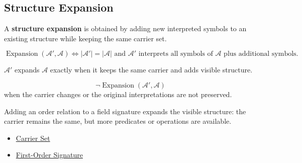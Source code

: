 \subsection*{Structure Expansion}
\label{subsec:structure-expansion}

\begin{definition}
\label{def:structure-expansion}
A \textbf{structure expansion} is obtained by adding new interpreted symbols to
an existing structure while keeping the same carrier set.
\end{definition}

\begin{remark*}
\[
\operatorname{Expansion}(\mathcal{A}',\mathcal{A})
\Longleftrightarrow
|\mathcal{A}'|=|\mathcal{A}|
\text{ and } \mathcal{A}' \text{ interprets all symbols of } \mathcal{A}
\text{ plus additional symbols.}
\]
\end{remark*}

\begin{remark*}
$\mathcal{A}'$ expands $\mathcal{A}$ exactly when it keeps the same carrier and
adds visible structure.
\end{remark*}

\begin{remark*}
\[
\neg\operatorname{Expansion}(\mathcal{A}',\mathcal{A})
\]
when the carrier changes or the original interpretations are not preserved.
\end{remark*}

\begin{remark*}[Interpretation]
Adding an order relation to a field signature expands the visible structure:
the carrier remains the same, but more predicates or operations are available.
\end{remark*}

\begin{dependencies}
\begin{itemize}
  \item \hyperref[def:carrier-set]{Carrier Set}
  \item \hyperref[def:first-order-signature]{First-Order Signature}
\end{itemize}
\end{dependencies}
